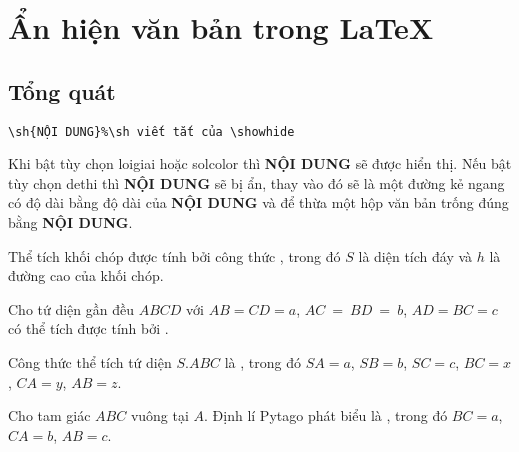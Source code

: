 \documentclass[12pt,a4paper,oneside]{article}
\begin{document}
\section{Ẩn hiện văn bản trong \LaTeX}
\subsection{Tổng quát}
\begin{verbatim}
\sh{NỘI DUNG}%\sh viết tắt của \showhide
\end{verbatim}

Khi bật tùy chọn loigiai hoặc solcolor thì \textbf{NỘI DUNG} sẽ được hiển thị. Nếu bật tùy chọn dethi thì \textbf{NỘI DUNG} sẽ bị ẩn, thay vào đó sẽ là một đường kẻ ngang có độ dài bằng độ dài của \textbf{NỘI DUNG} và để thừa một hộp văn bản trống đúng bằng \textbf{NỘI DUNG}.
\begin{ex}
	Thể tích khối chóp được tính bởi công thức , trong đó $S$ là diện tích đáy và $h$ là đường cao của khối chóp.
\end{ex}
\begin{ex}
	Cho tứ diện gần đều $ABCD$ với $AB=CD=a$, $AC~=~BD~=~b$, $AD=BC=c$ có thể tích được tính bởi .
\end{ex}
\begin{ex}
	Công thức thể tích tứ diện $S.ABC$ là , trong đó $SA=a$, $SB=b$, $SC=c$, $BC=x$, $CA=y$, $AB=z$.
\end{ex}

\begin{ex}
	Cho tam giác $ABC$ vuông tại $A$. Định lí Pytago phát biểu là , trong đó  $BC=a$, $CA=b$, $AB=c$. 
\end{ex}
\end{document}
